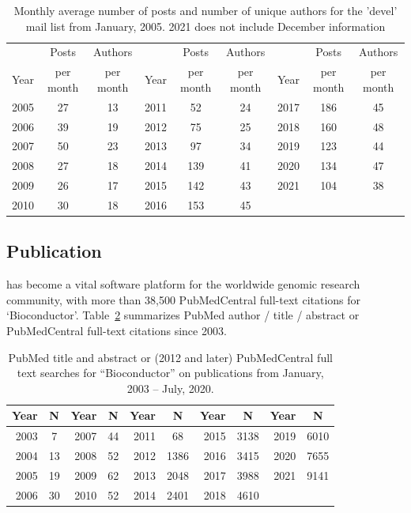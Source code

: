 \documentclass[letterpaper]{article}
\begin{document}
\begin{table}
\begin{center}
\caption{Monthly average number of posts and number of unique authors
  for the \Bioconductor{} 'devel' mail list from January, 2005. 2021 does not
  include December information}
\label{tbl:av_posts}
\begin{tabular}{lcc|lcc|lcc}
  \\
       & Posts     & Authors   &      & Posts     & Authors   &      & Posts     & Authors\\
  Year & per month & per month & Year & per month & per month & Year & per month & per month\\
  \hline\noalign{\smallskip}
  2005 & 27        & 13        & 2011 & 52        & 24        & 2017 & 186 & 45 \\
  2006 & 39        & 19        & 2012 & 75        & 25        & 2018 & 160 & 48 \\
  2007 & 50        & 23        & 2013 & 97        & 34        & 2019 & 123 & 44 \\
  2008 & 27        & 18        & 2014 & 139       & 41        & 2020 & 134 & 47 \\
  2009 & 26        & 17        & 2015 & 142       & 43        & 2021 & 104 & 38 \\
  2010 & 30        & 18        & 2016 & 153       & 45\\
\end{tabular}
\end{center}
\end{table}



\subsection{Publication}

\Bioconductor{} has become a vital software platform for the worldwide
genomic research community, with more than 38,500 PubMedCentral
full-text citations for `Bioconductor'. Table~\ref{table:pubMed}
summarizes PubMed author / title / abstract or PubMedCentral full-text
citations since 2003.

\begin{table}
  \caption{PubMed title and abstract or (2012 and later) PubMedCentral full text searches for ``Bioconductor'' on
    publications from January, 2003 -- July, 2020.}
  \label{table:pubMed}
  \begin{center}
    \begin{tabular}{rc|rc|rc|rc|rc}
      Year &  N & Year &  N & Year &    N & Year  & N    & Year  & N\\\hline\noalign{\smallskip}
      2003 &  7 & 2007 & 44 & 2011 &   68 & 2015  & 3138 & 2019  & 6010 \\
      2004 & 13 & 2008 & 52 & 2012 & 1386 & 2016  & 3415 & 2020 & 7655 \\
      2005 & 19 & 2009 & 62 & 2013 & 2048 & 2017  & 3988 & 2021 & 9141 \\
      2006 & 30 & 2010 & 52 & 2014 & 2401 & 2018  & 4610 & \\
    \end{tabular}
  \end{center}
\end{table}
\end{document}
